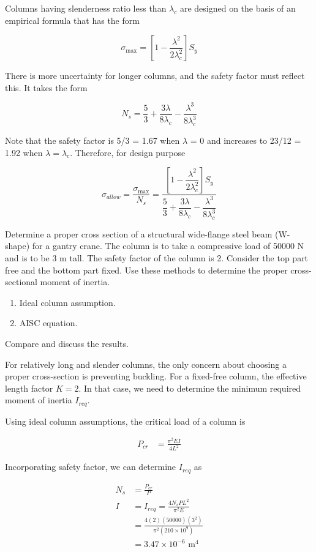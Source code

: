 \documentclass[a4paper,openany,nobib]{tufte-book}
\begin{document}
{{\begin{enumerate}
Columns having slenderness ratio less than \(\lambda_c\) are designed on
the basis of an empirical formula that has the form

$$\sigma _{\max} = \left[ 1 - \frac{\lambda^2}{2\lambda_c^2} \right]S_y$$

There is more uncertainty for longer columns, and the safety factor must
reflect this. It takes the form

$$N_s = \frac{5}{3} + \frac{3\lambda}{8\lambda_c} - \frac{\lambda^3}{8\lambda_c^3}$$

Note that the safety factor is 5/3 = 1.67 when \(\lambda\) = 0 and
increases to 23/12 = 1.92 when \(\lambda = \lambda_c\). Therefore, for
design purpose

$$\sigma_{allow} = \frac{\sigma_{\max}}{N_s} = \frac{\left[ 1 - \dfrac{\lambda^2}{2\lambda_c^2} \right] S_y }{\dfrac{5}{3} + \dfrac{ 3\lambda }{8\lambda_c} - \dfrac{\lambda^3}{8\lambda_c^3}}$$


Determine a proper cross section of a structural wide-flange steel beam
(W-shape) for a gantry crane. The column is to take a compressive load
of 50000 N and is to be 3 m tall. The safety factor of the column is 2.
Consider the top part free and the bottom part fixed. Use these methods
to determine the proper cross-sectional moment of inertia.

\begin{enumerate}
\item Ideal column assumption.

\item AISC equation.
\end{enumerate}

Compare and discuss the results.

For relatively long and slender columns, the only concern about choosing
a proper cross-section is preventing buckling. For a fixed-free column,
the effective length factor \(K = 2\). In that case, we need to determine
the minimum required moment of inertia \(I_{req}\).

Using ideal column assumptions, the critical load of a column is

$$\begin{aligned}
    P_{cr} &= \frac{\pi^2 EI}{4L^2}
  \end{aligned}$$

Incorporating safety factor, we can determine \(I_{req}\) as

$$\begin{aligned}
    N_s &= \frac{P_{cr}}{P} \\
    I &= I_{req} = \frac{4 N_s P L^2}{\pi^2 E} \\
        &= \frac{4(2)(50000)(3^2)}{\pi^2 (210 \times 10^9)} \\
        &= 3.47 \times 10^{-6} \text{ m}^4
  \end{aligned}$$


\end{enumerate}}}
\end{document}
